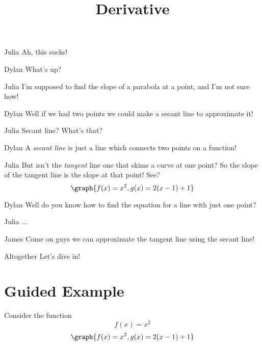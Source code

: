 \documentclass{ximera}
\title{Derivative}
\begin{document}
\maketitle
\begin{dialogue}
\item[Julia] Ah, this sucks!
\item[Dylan] What's up?
\item[Julia] I'm supposed to find the slope of a parabola at a point, and I'm not sure how!
\item[Dylan] Well if we had two points we could make a secant line to approximate it!
\item[Julia] Secant line? What's that?
\item[Dylan] A \textit{secant line} is just a line which connects two points on a function!
\item[Julia] But isn't the \textit{tangent} line one that skims a curve at one point? So the slope of the tangent line is the slope at that point! See?
\[
\graph{f(x)=x^2,g(x)=2(x-1)+1}
\]
\item[Dylan] Well do you know how to find the equation for a line with just one point?
\item[Julia]...
\item[James] Come on guys we can approximate the tangent line using the secant line!
\item[Altogether]Let's dive in!
\end{dialogue}



\section{Guided Example}

Consider the function $$f(x) = x^2$$
\[
\graph{f(x)=x^2,g(x)=2(x-1)+1}
\]
\end{document}
